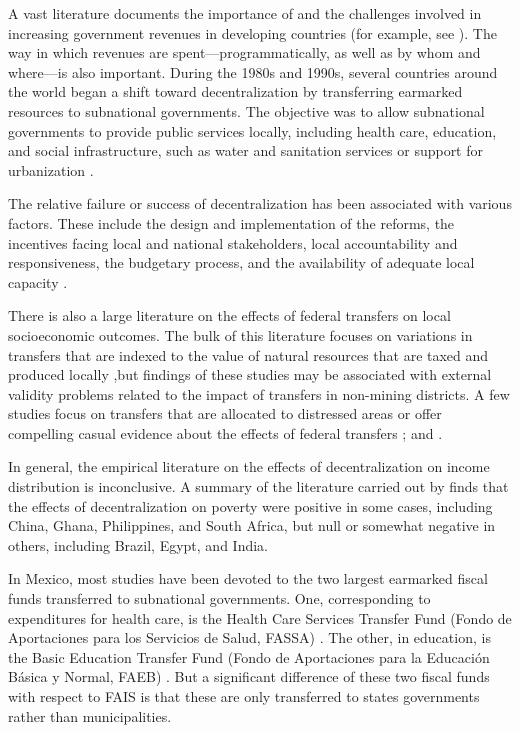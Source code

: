 \documentclass[dv_diss_main.tex]{subfiles}
\begin{document}
A vast literature documents the importance of and the challenges involved in increasing government revenues in developing countries (for example, see \cite{besley2014developing}). The way in which revenues are spent—programmatically, as well as by whom and where—is also important. During the 1980s and 1990s, several countries around the world began a shift toward decentralization by transferring earmarked resources to subnational governments. The objective was to allow subnational governments to provide public services locally, including health care, education, and social infrastructure, such as water and sanitation services or support for urbanization \citep{conning1999community,jimenez1999community,bardhan2005decentralizing}.

The relative failure or success of decentralization has been associated with various factors. These include the design and implementation of the reforms, the incentives facing local and national stakeholders, local accountability and responsiveness, the budgetary process, and the availability of adequate local capacity \citep{ahmad2005decentralization,robinson2007does,martinez2011decentralization,loayza2014more}. 

There is also a large literature on the effects of federal transfers on local socioeconomic outcomes. The bulk of this literature focuses on variations in transfers that are indexed to the value of natural resources that are taxed and produced locally \citep{loayza2013poverty,enamorado2014regional,zambrano2014global},but findings of these studies may be associated with external validity problems related to the impact of transfers in non-mining districts. A few studies focus on transfers that are allocated to distressed areas \cite{araujo2008local}or offer compelling casual evidence about the effects of federal transfers \cite{caselli2009oil}; and \cite{corbi2019regional}. 

In general, the empirical literature on the effects of decentralization on income distribution is inconclusive. A summary of the literature carried out by \cite{jutting2004decentralisation} finds that the effects of decentralization on poverty were positive in some cases, including China, Ghana, Philippines, and South Africa, but null or somewhat negative in others, including Brazil, Egypt, and India.

In Mexico, most studies have been devoted to the two largest earmarked fiscal funds transferred to subnational governments. One, corresponding to expenditures for health care, is the Health Care Services Transfer Fund (Fondo de Aportaciones para los Servicios de Salud, FASSA) \citep{moreno2001descentralizacion,merino2003descentralizacion,molina2014decentralization,martinez2011decentralization}. The other, in education, is the Basic Education Transfer Fund (Fondo de Aportaciones para la Educación Básica y Normal, FAEB) \citep{esquivel1999gasto,latapi2000financiamiento,avendano2012evaluacion}. But a significant difference of these two fiscal funds with respect to FAIS is that these are only transferred to states governments rather than municipalities.
\end{document}
